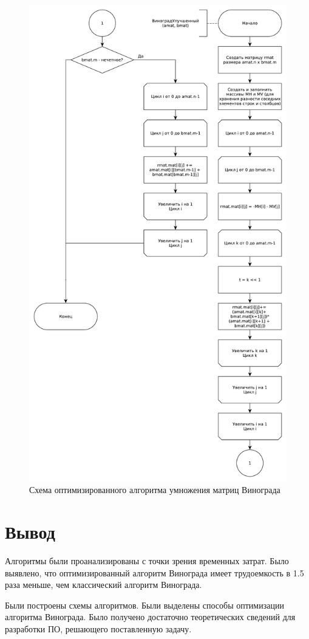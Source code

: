 \begin{figure}[ht!]
	\centering
	\includegraphics[width=0.75\linewidth]{assets/mtx-win2.pdf}
	\caption{Схема оптимизированного алгоритма умножения матриц Винограда}
	\label{fig:win-2}
\end{figure}

\newpage
\section*{Вывод}
Алгоритмы были проанализированы с точки зрения временных затрат. Было выявлено, что оптимизированный алгоритм  Винограда имеет трудоемкость в 1.5 раза меньше, чем классический алгоритм Винограда.


Были построены схемы алгоритмов. Были выделены способы оптимизации алгоритма Винограда. Было получено достаточно теоретических сведений для разработки ПО, решающего поставленную задачу.